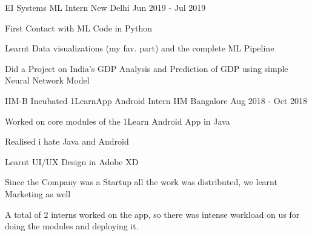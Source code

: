 \begin{cventries}

\cventry
    {EI Systems}
    {ML Intern}
    {New Delhi}
    {Jun 2019 - Jul 2019}
    {
        \begin{cvitems}
            \item {First Contact with ML Code in Python}
            \item {Learnt Data visualizations (my fav. part) and the complete ML Pipeline}
            \item {Did a Project on India's GDP Analysis and Prediction of GDP using simple Neural Network Model}
        \end{cvitems}
    }

\cventry
    {IIM-B Incubated}
    {1LearnApp Android Intern}
    {IIM Bangalore}
    {Aug 2018 - Oct 2018}
    {
        \begin{cvitems}
            \item {Worked on core modules of the 1Learn Android App in Java}
            \item {Realised i hate Java and Android}
            \item {Learnt UI/UX Design in Adobe XD}
            \item {Since the Company was a Startup all the work was distributed, we learnt Marketing as well}
            \item {A total of 2 interns worked on the app, so there was intense workload on us for doing the
    modules and deploying it.}
        \end{cvitems}
    }


\end{cventries}